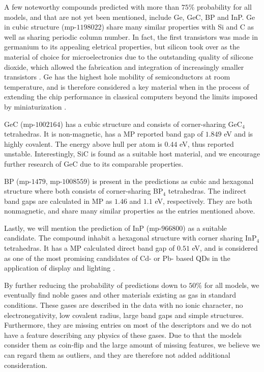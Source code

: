 A few noteworthy compounds predicted with more than $75\%$ probability for all models, and that are not yet been mentioned, include Ge, GeC, BP and InP. Ge in cubic structure (mp-$1198022$) share many similar properties with Si and C as well as sharing periodic column number. In fact, the first transistors was made in germanium to its appealing eletrical properties, but silicon took over as the material of choice for microelectronics due to the outstanding quality of silicone dioxide, which allowed the fabrication and integration of increasingly smaller transistors \cite{Scappucci2020, Pillarisetty2011}. Ge has the highest hole mobility of semiconductors at room temperature, and is therefore considered a key material when in the process of extending the chip performance in classical computers beyond the limits imposed by miniaturization \cite{Scappucci2020}.

GeC (mp-$1002164$) \cite{GeC} has a cubic structure and consists of corner-sharing GeC$_4$ tetrahedras. It is non-magnetic, has a MP reported band gap of $1.849$ eV and is highly covalent. The energy above hull per atom is $0.44$ eV, thus reported unstable. Interestingly, SiC is found as a suitable host material, and we encourage further research of GeC due to its comparable properties.

BP (mp-$1479$, mp-$1008559$) is present in the predictions as cubic \cite{BP1} and hexagonal \cite{BP2} structure where both consists of corner-sharing BP$_4$ tetrahedras. The indirect band gaps are calculated in MP as $1.46$ and $1.1$ eV, respectively. They are both nonmagnetic, and share many similar properties as the entries mentioned above.

Lastly, we will mention the prediction of InP (mp-$966800$) \cite{InP} as a suitable candidate. The compound inhabit a hexagonal structure with corner sharing InP$_4$ tetrahedras. It has a MP calculated direct band gap of $0.51$ eV, and is considered as one of the most promising candidates of Cd- or Pb- based QDs in the application of display and lighting \cite{Zhang2020a, Won2019}.

By further reducing the probability of predictions down to $50\%$ for all models, we eventually find noble gases and other materials existing as gas in standard conditions. These gases are described in the data with no ionic character, no electronegativity, low covalent radius, large band gaps and simple structures. Furthermore, they are missing entries on most of the descriptors and we do not have a feature describing any physics of these gases. Due to that the models consider them as coin-flip and the large amount of missing features, we believe we can regard them as outliers, and they are therefore not added additional consideration.

